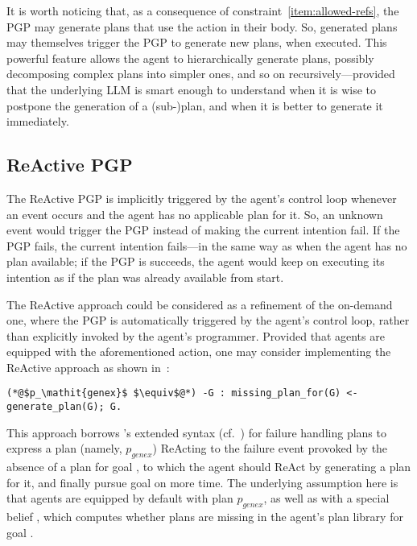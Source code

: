 \documentclass[12pt,a4paper,openright,twoside]{book}
\begin{document}
It is worth noticing that, as a consequence of constraint~\ref{item:allowed-refs}, the \ac{PGP} may generate plans that use the  action in their body.
%
So, generated plans may themselves trigger the \ac{PGP} to generate new plans, when executed.
%
This powerful feature allows the agent to hierarchically generate plans, possibly decomposing complex plans into simpler ones, and so on recursively---provided that the underlying \ac{LLM} is smart enough to understand when it is wise to postpone the generation of a (sub-)plan, and when it is better to generate it immediately.

\subsection{\ac{ReAct}ive PGP}

The \ac{ReAct}ive \ac{PGP} is implicitly triggered by the agent's control loop whenever an event  occurs and the agent has no applicable plan for it.
%
So, an unknown event would trigger the \ac{PGP} instead of making the current intention fail.
%
If the \ac{PGP} fails, the current intention fails---in the same way as when the agent has no plan available; if the \ac{PGP} is succeeds, the agent would keep on executing its intention as if the plan was already available from start.

The \ac{ReAct}ive approach could be considered as a refinement of the on-demand one, where the \ac{PGP} is automatically triggered by the agent's control loop, rather than explicitly invoked by the agent's programmer.
%
Provided that agents are equipped with the aforementioned  action, one may consider implementing the \ac{ReAct}ive approach as shown in~:
%
\begin{lstlisting}[label={lst:recative-pgp}, caption={One possible implementation of a \ac{ReAct}ive \ac{PGP}}, captionpos=b]
(*@$p_\mathit{genex}$ $\equiv$@*) -G : missing_plan_for(G) <- generate_plan(G); G.
\end{lstlisting}
%
This approach borrows \jason{}'s extended \agentspeak{} syntax (cf.~\cite{BordiniHW2007}) for failure handling plans\footnotemark{} to express a plan (namely, $p_{genex}$) \ac{ReAct}ing to the failure event provoked by the absence of a plan for goal , to which the agent should \ac{ReAct} by generating a plan for it, and finally pursue goal  on more time.
%
The underlying assumption here is that agents are equipped by default with plan $p_\mathit{genex}$, as well as with a special belief , which computes whether plans are missing in the agent's plan library for goal .
%
\end{document}
